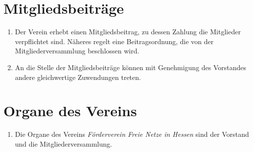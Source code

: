 \documentclass[ngerman]{article}
\newcommand{\NameVerein}{Förderverein Freie Netze in Hessen}
\begin{document}
\section{Mitgliedsbeiträge}
\begin{enumerate}
  \item Der Verein erhebt einen Mitgliedsbeitrag, zu dessen Zahlung die Mitglieder verpflichtet sind. Näheres regelt eine Beitragsordnung, die von der Mitgliederversammlung beschlossen wird.
  \item An die Stelle der Mitgliedsbeiträge können mit Genehmigung des Vorstandes andere gleichwertige Zuwendungen treten.
\end{enumerate}


\section{Organe des Vereins}
\begin{enumerate}
  \item Die Organe des Vereins \emph{\NameVerein} sind der Vorstand und die Mitgliederversammlung.
\end{enumerate}
\end{document}
